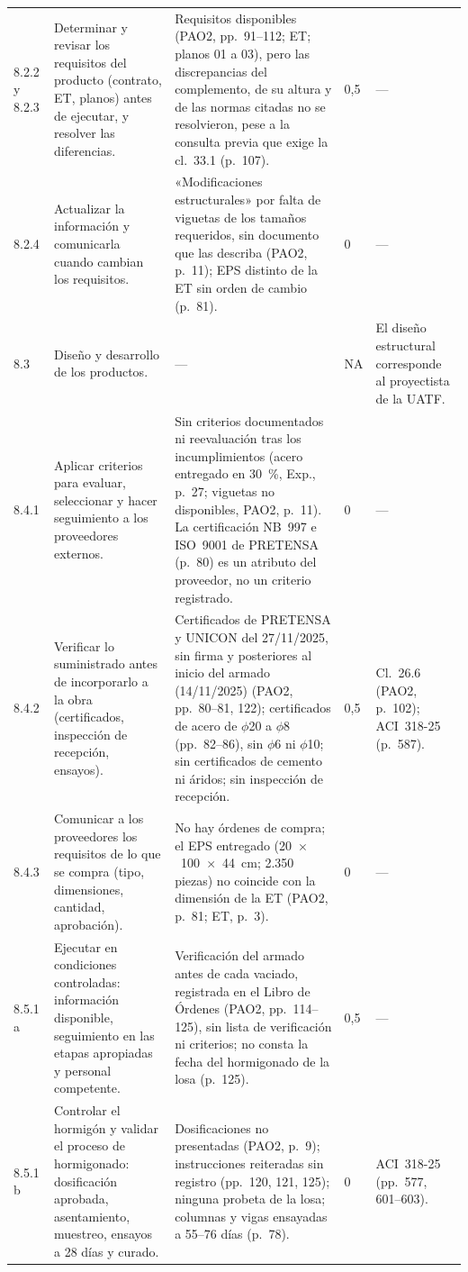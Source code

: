 \begin{longtable}{@{}P{1.35cm}P{3.7cm}P{5.0cm}Q{0.85cm}P{4.1cm}@{}}
8.2.2 y 8.2.3 & Determinar y revisar los requisitos del producto (contrato, ET, planos) antes de ejecutar, y resolver las diferencias. & Requisitos disponibles (PAO2, pp.~91--112; ET; planos 01 a 03), pero las discrepancias del complemento, de su altura y de las normas citadas no se resolvieron, pese a la consulta previa que exige la cl.~33.1 (p.~107). & 0,5 & --- \\
8.2.4 & Actualizar la información y comunicarla cuando cambian los requisitos. & «Modificaciones estructurales» por falta de viguetas de los tamaños requeridos, sin documento que las describa (PAO2, p.~11); EPS distinto de la ET sin orden de cambio (p.~81). & 0 & --- \\
8.3 & Diseño y desarrollo de los productos. & --- & NA & El diseño estructural corresponde al proyectista de la UATF. \\
8.4.1 & Aplicar criterios para evaluar, seleccionar y hacer seguimiento a los proveedores externos. & Sin criterios documentados ni reevaluación tras los incumplimientos (acero entregado en 30~\%, Exp., p.~27; viguetas no disponibles, PAO2, p.~11). La certificación NB~997 e ISO~9001 de PRETENSA (p.~80) es un atributo del proveedor, no un criterio registrado. & 0 & --- \\
8.4.2 & Verificar lo suministrado antes de incorporarlo a la obra (certificados, inspección de recepción, ensayos). & Certificados de PRETENSA y UNICON del 27/11/2025, sin firma y posteriores al inicio del armado (14/11/2025) (PAO2, pp.~80--81, 122); certificados de acero de $\phi$20 a $\phi$8 (pp.~82--86), sin $\phi$6 ni $\phi$10; sin certificados de cemento ni áridos; sin inspección de recepción. & 0,5 & Cl.~26.6 (PAO2, p.~102); ACI~318-25 (p.~587). \\
8.4.3 & Comunicar a los proveedores los requisitos de lo que se compra (tipo, dimensiones, cantidad, aprobación). & No hay órdenes de compra; el EPS entregado (20~$\times$~100~$\times$~44~cm; 2.350 piezas) no coincide con la dimensión de la ET (PAO2, p.~81; ET, p.~3). & 0 & --- \\
8.5.1 a & Ejecutar en condiciones controladas: información disponible, seguimiento en las etapas apropiadas y personal competente. & Verificación del armado antes de cada vaciado, registrada en el Libro de Órdenes (PAO2, pp.~114--125), sin lista de verificación ni criterios; no consta la fecha del hormigonado de la losa (p.~125). & 0,5 & --- \\
8.5.1 b & Controlar el hormigón y validar el proceso de hormigonado: dosificación aprobada, asentamiento, muestreo, ensayos a 28 días y curado. & Dosificaciones no presentadas (PAO2, p.~9); instrucciones reiteradas sin registro (pp.~120, 121, 125); ninguna probeta de la losa; columnas y vigas ensayadas a 55--76 días (p.~78). & 0 & ACI~318-25 (pp.~577, 601--603). \\

\end{longtable}
